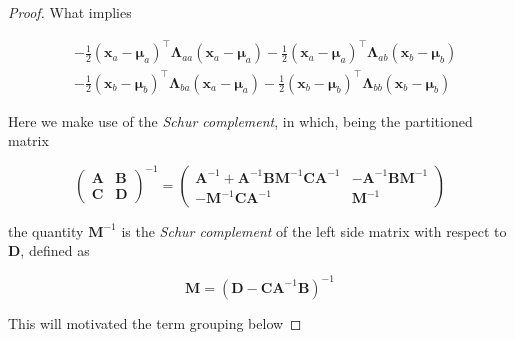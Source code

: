 \begin{appendices}
\begin{proof}
    What implies

    \begin{equation}
    \begin{aligned} &-\frac{1}{2}\left(\mathbf{x}_{a}-\boldsymbol{\mu}_{a}\right)^\top \boldsymbol{\Lambda}_{a a}\left(\mathbf{x}_{a}-\boldsymbol{\mu}_{a}\right)-\frac{1}{2}\left(\mathbf{x}_{a}-\boldsymbol{\mu}_{a}\right)^\top \boldsymbol{\Lambda}_{a b}\left(\mathbf{x}_{b}-\boldsymbol{\mu}_{b}\right) \\ &-\frac{1}{2}\left(\mathbf{x}_{b}-\boldsymbol{\mu}_{b}\right)^\top \boldsymbol{\Lambda}_{b a}\left(\mathbf{x}_{a}-\boldsymbol{\mu}_{a}\right)-\frac{1}{2}\left(\mathbf{x}_{b}-\boldsymbol{\mu}_{b}\right)^\top \boldsymbol{\Lambda}_{b b}\left(\mathbf{x}_{b}-\boldsymbol{\mu}_{b}\right) 
    \end{aligned}
    \end{equation}

    Here we make use of the \textit{Schur complement}, in which, being the partitioned matrix

    \begin{equation}
    \left(\begin{array}{cc}{\mathbf{A}} & {\mathbf{B}} \\ {\mathbf{C}} & {\mathbf{D}}\end{array}\right)^{-1}=\left(\begin{array}{cc}{\mathbf{A}^{-1}+\mathbf{A}^{-1} \mathbf{B} \mathbf{M}^{-1} \mathbf{C} \mathbf{A}^{-1}} & {-\mathbf{A}^{-1} \mathbf{B} \mathbf{M}^{-1}} \\ {-\mathbf{M}^{-1} \mathbf{C} \mathbf{A}^{-1}} & {\mathbf{M}^{-1}}\end{array}\right)
    \end{equation}

    the quantity $\mathbf{M}^{-1}$ is the \textit{Schur complement} of the left side matrix with respect to $\mathbf{D}$, defined as 

    \begin{equation}
      \label{eq:app-par-gau-schur}
      \mathbf{M}=\left(\mathbf{D}-\mathbf{C A}^{-1} \mathbf{B}\right)^{-1}  
    \end{equation}

    This will motivated the term grouping below


\end{proof}
\end{appendices}
